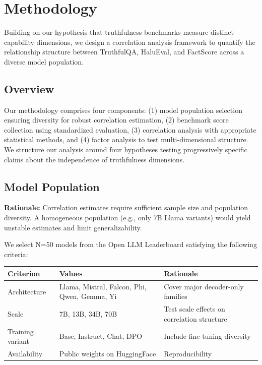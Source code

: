 \section{Methodology}
\label{sec:methodology}

Building on our hypothesis that truthfulness benchmarks measure distinct capability dimensions, we design a correlation analysis framework to quantify the relationship structure between TruthfulQA, HaluEval, and FactScore across a diverse model population.

\subsection{Overview}

Our methodology comprises four components: (1) model population selection ensuring diversity for robust correlation estimation, (2) benchmark score collection using standardized evaluation, (3) correlation analysis with appropriate statistical methods, and (4) factor analysis to test multi-dimensional structure. We structure our analysis around four hypotheses testing progressively specific claims about the independence of truthfulness dimensions.

\subsection{Model Population}

\textbf{Rationale:} Correlation estimates require sufficient sample size and population diversity. A homogeneous population (e.g., only 7B Llama variants) would yield unstable estimates and limit generalizability.

We select N=50 models from the Open LLM Leaderboard satisfying the following criteria:

\begin{table}[h]
\centering
\begin{tabular}{@{}lll@{}}
\toprule
\textbf{Criterion} & \textbf{Values} & \textbf{Rationale} \\
\midrule
Architecture & Llama, Mistral, Falcon, Phi, Qwen, Gemma, Yi & Cover major decoder-only families \\
Scale & 7B, 13B, 34B, 70B & Test scale effects on correlation structure \\
Training variant & Base, Instruct, Chat, DPO & Include fine-tuning diversity \\
Availability & Public weights on HuggingFace & Reproducibility \\
\bottomrule
\end{tabular}
\end{table}

